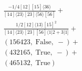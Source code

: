\documentclass[varwidth, border=5pt]{standalone}
\begin{document}
\begin{my}
$\begin{gathered}
\scriptscriptstyle\frac{-1/4[12][15]⟨36⟩}{[14]⟨23⟩[23]⟨56⟩[56]}+\\
\scriptscriptstyle\frac{1/2[12]⟨13⟩[15]^2}{[14]⟨23⟩[23][56]⟨1|2+3|1]}+\\
\scriptscriptstyle(156423,\;\text{False},\;-)+\\
\scriptscriptstyle(432165,\;\text{True},\;-)+\\
\scriptscriptstyle(465132,\;\text{True})\phantom{+}
\end{gathered}$
\end{my}
\end{document}

